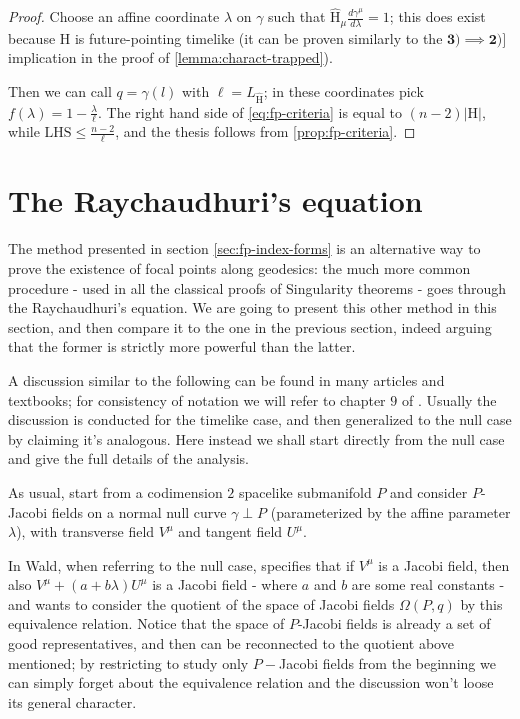 	\begin{proof}
		Choose an affine coordinate \(\lambda\) on \(\gamma\) such that \(\hat{\mathrm{H}}_{\mu}\frac{d\gamma^{\mu}}{d\lambda} = 1\); this does exist because \(\mathrm{H}\) is future-pointing timelike (it can be proven similarly to the \(\mathbf{3) \implies 2)]}\) implication in the proof of \ref{lemma:charact-trapped}).
		
		Then we can call \(q = \gamma(l)\) with \(\ell = L_{\hat{\mathrm{H}}}\); in these coordinates pick \(f(\lambda) = 1 - \frac{\lambda}{\ell}\). The right hand side of \eqref{eq:fp-criteria} is equal to \((n-2)|\mathrm{H}|\), while \(\text{LHS} \le \frac{n - 2}{\ell}\), and the thesis follows from \ref{prop:fp-criteria}.
	\end{proof}
	
	\section{The Raychaudhuri's equation}
	The method presented in section \ref{sec:fp-index-forms} is an alternative way to prove the existence of focal points along geodesics: the much more common procedure - used in all the classical proofs of Singularity theorems \cite{penrose1965gravitational} - goes through the Raychaudhuri's equation. We are going to present this other method in this section, and then compare it to the one in the previous section, indeed arguing that the former is strictly more powerful than the latter.
	
	A discussion similar to the following can be found in many articles and textbooks; for consistency of notation we will refer to chapter \(9\) of \cite{wald2010general} .
	Usually the discussion is conducted for the timelike case, and then generalized to the null case by claiming it's analogous. Here instead we shall start directly from the null case and give the full details of the analysis.
	
	As usual, start from a codimension \(2\) spacelike submanifold \(P\) and consider \(P\)-Jacobi fields on a normal null curve \(\gamma \perp P\) (parameterized by the affine parameter \(\lambda\)), with transverse field \(V^{\mu}\) and tangent field \(U^{\mu}\).
	\begin{remark}
		In \cite{wald2010general} Wald, when referring to the null case, specifies that if \(V^{\mu}\) is a Jacobi field, then also \(V^{\mu} + (a + b\lambda) U^{\mu}\) is a Jacobi field - where \(a\) and \(b\) are some real constants - and wants to consider the quotient of the space of Jacobi fields \(\Omega (P,q)\) by this equivalence relation. Notice that the space of \(P\)-Jacobi fields is already a set of good representatives, and then can be reconnected to the quotient above mentioned; by restricting to study only \(P-\)Jacobi fields from the beginning we can simply forget about the equivalence relation and the discussion won't loose its general character.
	\end{remark}

